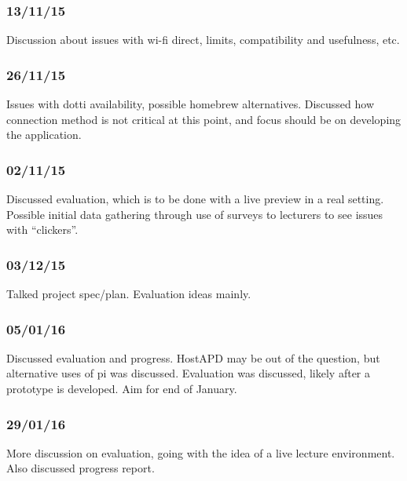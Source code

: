 \documentclass{article}
\begin{document}
\subsubsection{13/11/15}
Discussion about issues with wi-fi direct, limits, compatibility and usefulness, etc.

\subsubsection{26/11/15} 
Issues with dotti availability, possible homebrew alternatives. Discussed how connection method is not critical at this point, and focus should be on developing the application.

\subsubsection{02/11/15}
Discussed evaluation, which is to be done with a live preview in a real setting.
Possible initial data gathering through use of surveys to lecturers to see issues with ``clickers''.

\subsubsection{03/12/15}
Talked project spec/plan. Evaluation ideas mainly.

\subsubsection{05/01/16}
Discussed evaluation and progress. HostAPD may be out of the question, but alternative uses of pi was discussed.
Evaluation was discussed, likely after a prototype is developed. Aim for end of January.

\subsubsection{29/01/16}
More discussion on evaluation, going with the idea of a live lecture environment. Also discussed progress report.
\end{document}
